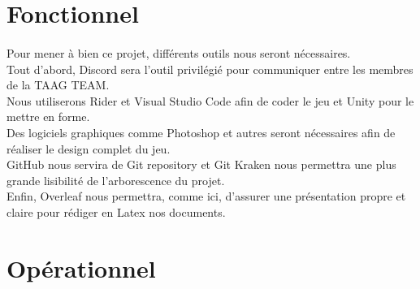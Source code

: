 \documentclass[12pt,a4paper]{article}
\begin{document}
\section{Fonctionnel}

\paragraph{}
Pour mener à bien ce projet, différents outils nous seront nécessaires. 
\\
Tout d’abord, Discord sera l’outil privilégié pour communiquer entre les membres de la TAAG TEAM. 
\\
Nous utiliserons Rider et Visual Studio Code afin de coder le jeu et Unity pour le mettre en forme. 
\\
Des logiciels graphiques comme Photoshop et autres seront nécessaires afin de réaliser le design complet du jeu. 
\\
GitHub nous servira de Git repository et Git Kraken nous permettra une plus grande lisibilité de l’arborescence du projet. 
\\
Enfin, Overleaf nous permettra, comme ici, d’assurer une présentation propre et claire pour rédiger en Latex nos documents. 

\vspace*{.2cm}
\section{Opérationnel}
\end{document}

